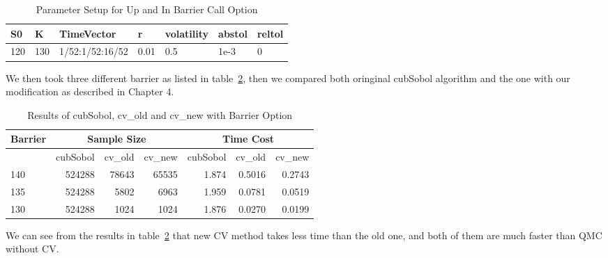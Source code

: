 \begin{table}[h]
\label{tb:BarrierPara}
    \caption{Parameter Setup for Up and In Barrier Call Option}
    \centering
	\begin{tabular}{lllllll}
        \hline\hline
        S0 & K & TimeVector & r & volatility & abstol & reltol \\[0.5ex]
        \hline
        120  & 130 & 1/52:1/52:16/52 & 0.01 & 0.5 & 1e-3 & 0\\[1ex]
        \hline
	\end{tabular}
\end{table}

We then took three different barrier as listed in table~\ref{tb:BarrierResults}, then we compared both oringinal cubSobol algorithm and the one with our modification as described in Chapter 4. 
\begin{table}[h]
    \centering
    \label{tb:BarrierResults}
	\caption{Results of cubSobol, cv\_old and cv\_new with Barrier Option}
    \begin{tabular}{lrrrrrr}
    \hline\hline
	Barrier &\multicolumn{3}{c}{Sample Size}
		&\multicolumn{3}{c}{Time Cost} \\
    \hline
	&cubSobol&cv\_old&cv\_new
    &cubSobol&cv\_old&cv\_new\\[0.5ex]
    \hline
	140  & 524288&78643& 65535
	     & 1.874& 0.5016&0.2743 \\ 
	135  & 524288& 5802&6963
	     & 1.959& 0.0781&0.0519 \\ 
	130  & 524288& 1024&1024
    & 1.876& 0.0270 & 0.0199 \\[1ex]
    \hline
	\end{tabular}
\end{table}
We can see from the results in table~\ref{tb:BarrierResults} that new CV method takes less time than the old one, and both of them are much faster than QMC without CV.
